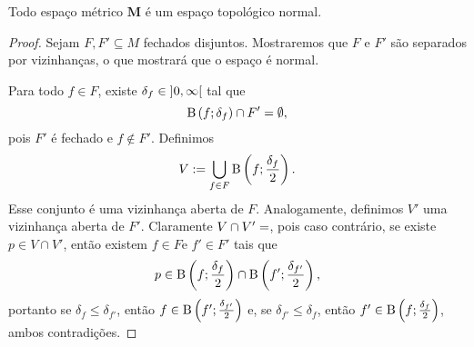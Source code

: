 \begin{proposition}
Todo espaço métrico $\bm M$ é um espaço topológico normal.
\end{proposition}
\begin{proof}
Sejam $F,F' \subseteq M$ fechados disjuntos. Mostraremos que $F$ e $F'$ são
separados por vizinhanças, o que mostrará que o espaço é normal.

Para todo $f \in F$, existe $\delta_f \in \left]0,\allowbreak \infty\right[$ tal que
	\begin{equation*}
	\mathrm{B}\left(f; \delta_f\right) \cap F' = \emptyset,
	\end{equation*}
pois $F'$ é fechado e $f \notin F'$. Definimos
	\begin{equation*}
	V := \bigcup_{f \in F} \mathrm{B}\left(f; \frac{\delta_f}{2}\right).
	\end{equation*}
Esse conjunto é uma vizinhança aberta de $F$. Analogamente, definimos $V'$ uma vizinhança aberta de $F'$. Claramente $V \cap V'=\empty$, pois caso contrário, se existe $p \in V \cap V'$, então existem $f \in F$e $f' \in F'$ tais que
	\begin{equation*}
	p \in \mathrm{B}\left(f; \frac{\delta_f}{2}\right) \cap \mathrm{B}\left(f'; \frac{\delta_{f'}}{2}\right),
	\end{equation*}
portanto se $\delta_f \leq \delta_{f'}$, então $f \in \mathrm{B}\left(f'; \frac{\delta_{f'}}{2}\right)$ e, se $\delta_{f'} \leq \delta_f$, então $f' \in \mathrm{B}\left(f; \frac{\delta_f}{2}\right)$, ambos contradições.
%
\end{proof}

